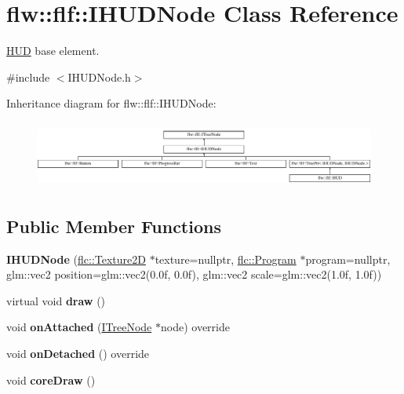 \hypertarget{classflw_1_1flf_1_1IHUDNode}{}\section{flw\+:\+:flf\+:\+:I\+H\+U\+D\+Node Class Reference}
\label{classflw_1_1flf_1_1IHUDNode}


\hyperlink{classflw_1_1flf_1_1HUD}{H\+UD} base element.  




{\ttfamily \#include $<$I\+H\+U\+D\+Node.\+h$>$}

Inheritance diagram for flw\+:\+:flf\+:\+:I\+H\+U\+D\+Node\+:\begin{figure}[H]
\begin{center}
\leavevmode
\includegraphics[height=2.222222cm]{classflw_1_1flf_1_1IHUDNode}
\end{center}
\end{figure}
\subsection*{Public Member Functions}
\begin{DoxyCompactItemize}
\item 
{\bfseries I\+H\+U\+D\+Node} (\hyperlink{classflw_1_1flc_1_1Texture2D}{flc\+::\+Texture2D} $\ast$texture=nullptr, \hyperlink{classflw_1_1flc_1_1Program}{flc\+::\+Program} $\ast$program=nullptr, glm\+::vec2 position=glm\+::vec2(0.\+0f, 0.\+0f), glm\+::vec2 scale=glm\+::vec2(1.\+0f, 1.\+0f))\hypertarget{classflw_1_1flf_1_1IHUDNode_a79410c95515a7f67e329f188a75eb2f1}{}\label{classflw_1_1flf_1_1IHUDNode_a79410c95515a7f67e329f188a75eb2f1}

\item 
virtual void {\bfseries draw} ()\hypertarget{classflw_1_1flf_1_1IHUDNode_a3b7f521fed9747d56cf8d7ee626c8c28}{}\label{classflw_1_1flf_1_1IHUDNode_a3b7f521fed9747d56cf8d7ee626c8c28}

\item 
void {\bfseries on\+Attached} (\hyperlink{classflw_1_1flf_1_1ITreeNode}{I\+Tree\+Node} $\ast$node) override\hypertarget{classflw_1_1flf_1_1IHUDNode_a36e5be05557f6daa4a7ef199fd1918e5}{}\label{classflw_1_1flf_1_1IHUDNode_a36e5be05557f6daa4a7ef199fd1918e5}

\item 
void {\bfseries on\+Detached} () override\hypertarget{classflw_1_1flf_1_1IHUDNode_a6979b712b6ef43ebffaf3419a670237f}{}\label{classflw_1_1flf_1_1IHUDNode_a6979b712b6ef43ebffaf3419a670237f}

\item 
void {\bfseries core\+Draw} ()\hypertarget{classflw_1_1flf_1_1IHUDNode_a744f438eb975e52fb88e28a12efc8411}{}\label{classflw_1_1flf_1_1IHUDNode_a744f438eb975e52fb88e28a12efc8411}

\end{DoxyCompactItemize}
